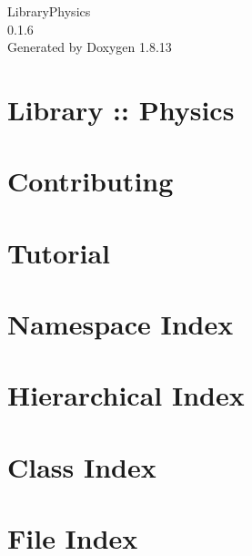 \documentclass[twoside]{book}
\newcommand{\+}{\discretionary{\mbox{\scriptsize$\hookleftarrow$}}{}{}}
\newcommand{\clearemptydoublepage}{%
  \newpage{\pagestyle{empty}\cleardoublepage}%
}
\begin{document}
\hypersetup{pageanchor=false,
             bookmarksnumbered=true,
             pdfencoding=unicode
            }
\begin{titlepage}
\vspace*{7cm}
\begin{center}%
{\Large Library\+Physics \\[1ex]\large 0.\+1.\+6 }\\
\vspace*{1cm}
{\large Generated by Doxygen 1.8.13}\\
\end{center}
\end{titlepage}
\clearemptydoublepage
{}
\tableofcontents
\clearemptydoublepage
{}
\hypersetup{pageanchor=true}

\chapter{Library \+:\+: Physics}
\label{index}\hypertarget{index}{}
\chapter{Contributing}
\label{md__c_o_n_t_r_i_b_u_t_i_n_g}

\chapter{Tutorial}
\label{md_docs__tutorial}

\chapter{Namespace Index}

\chapter{Hierarchical Index}

\chapter{Class Index}

\chapter{File Index}

\end{document}
